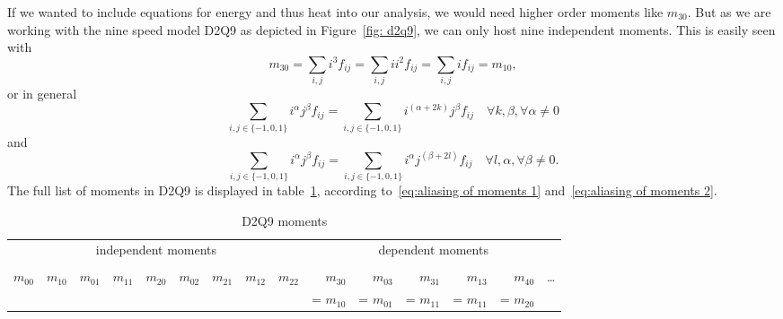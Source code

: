 If we wanted to include equations for energy and thus heat into our analysis, we would need higher order moments like $m_{30}$.
But as we are working with the nine speed model D2Q9 as depicted in Figure~\ref{fig: d2q9}, we can only host nine independent moments.
This is easily seen with
\begin{equation}
  m_{30} = \sum_{i,j} i^3 f_{ij} = \sum_{i,j} i i^2 f_{ij} = \sum_{i,j} i f_{ij} = m_{10},
\end{equation}
or in general
\begin{equation}
  \label{eq:aliasing of moments 1}
  \sum_{i,j \in \{-1,0,1\}} i^\alpha j^\beta f_{ij} = \sum_{i,j \in \{-1,0,1\}} i^{(\alpha+2k)} j^\beta f_{ij} \quad \forall k,\beta, \forall \alpha \neq 0
\end{equation}
and
\begin{equation}
  \label{eq:aliasing of moments 2}
  \sum_{i,j \in \{-1,0,1\}} i^\alpha j^\beta f_{ij} = \sum_{i,j \in \{-1,0,1\}} i^\alpha j^{(\beta+2l)} f_{ij} \quad \forall l, \alpha, \forall \beta \neq 0.
\end{equation}
The full list of moments in D2Q9 is displayed in table~\ref{table:D2Q9 moments}, according to~\eqref{eq:aliasing of moments 1} and~\eqref{eq:aliasing of moments 2}.

\setlength{\tabcolsep}{3pt}
\begin{table} [ht!]
  \centering
  \begin{tabular}{r rr rrr rr r rrrrr r}
    \toprule
    \multicolumn{9}{c}{independent moments} & \multicolumn{6}{c}{dependent moments}   \\
    \cmidrule(lr){1-9}\cmidrule(lr){10-15} \\
    $m_{00}$
    & $m_{10}$
    & $m_{01}$
    & $m_{11}$
    & $m_{20}$
    & $m_{02}$
    & $m_{21}$
    & $m_{12}$
    & $m_{22}$
    & $m_{30}$
    & $m_{03}$
    & $m_{31}$
    & $m_{13}$
    & $m_{40}$
    & \ldots \\
    &&&&&&&&
    &= $m_{10}$
    & = $m_{01}$
    & = $m_{11}$
    & = $m_{11}$
    & = $m_{20}$ & \\
    \bottomrule
  \end{tabular}
  \caption{D2Q9 moments}\label{table:D2Q9 moments}
\end{table}
